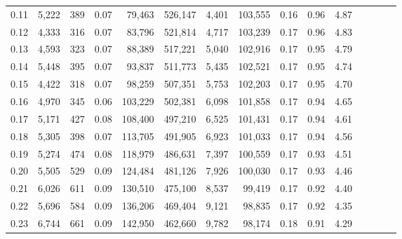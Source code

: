 \begin{tabular}{rrrcrrrrrrrrrrr}
0.11 &   5,222 &    389 &                                       0.07 &   79,463 &  526,147 &    4,401 &  103,555 &  0.16 &  0.96 &                         4.87 \\
0.12 &   4,333 &    316 &                                       0.07 &   83,796 &  521,814 &    4,717 &  103,239 &  0.17 &  0.96 &                         4.83 \\
0.13 &   4,593 &    323 &                                       0.07 &   88,389 &  517,221 &    5,040 &  102,916 &  0.17 &  0.95 &                         4.79 \\
0.14 &   5,448 &    395 &                                       0.07 &   93,837 &  511,773 &    5,435 &  102,521 &  0.17 &  0.95 &                         4.74 \\
0.15 &   4,422 &    318 &                                       0.07 &   98,259 &  507,351 &    5,753 &  102,203 &  0.17 &  0.95 &                         4.70 \\
0.16 &   4,970 &    345 &                                       0.06 &  103,229 &  502,381 &    6,098 &  101,858 &  0.17 &  0.94 &                         4.65 \\
0.17 &   5,171 &    427 &                                       0.08 &  108,400 &  497,210 &    6,525 &  101,431 &  0.17 &  0.94 &                         4.61 \\
0.18 &   5,305 &    398 &                                       0.07 &  113,705 &  491,905 &    6,923 &  101,033 &  0.17 &  0.94 &                         4.56 \\
0.19 &   5,274 &    474 &                                       0.08 &  118,979 &  486,631 &    7,397 &  100,559 &  0.17 &  0.93 &                         4.51 \\
0.20 &   5,505 &    529 &                                       0.09 &  124,484 &  481,126 &    7,926 &  100,030 &  0.17 &  0.93 &                         4.46 \\
0.21 &   6,026 &    611 &                                       0.09 &  130,510 &  475,100 &    8,537 &   99,419 &  0.17 &  0.92 &                         4.40 \\
0.22 &   5,696 &    584 &                                       0.09 &  136,206 &  469,404 &    9,121 &   98,835 &  0.17 &  0.92 &                         4.35 \\
0.23 &   6,744 &    661 &                                       0.09 &  142,950 &  462,660 &    9,782 &   98,174 &  0.18 &  0.91 &                         4.29 \\

\end{tabular}
